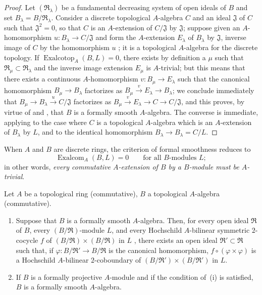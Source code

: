 \begin{proof}
Let $(\mathfrak{R}_\lambda)$ be a fundamental decreasing system of open ideals of $B$ and set $B_\lambda=B/\mathfrak{R}_\lambda$.
Consider a discrete topological $A$-algebra $C$ and an ideal $\mathfrak{J}$ of $C$ such that $\mathfrak{J}^2=0$, so that $C$ is an $A$-extension of $C/\mathfrak{J}$ by $\mathfrak{J}$;
suppose given an $A$-homomorphism $u:B_\lambda\to C/\mathfrak{J}$ and form the $A$-extension $E_\lambda$ of $B_\lambda$ by $\mathfrak{J}$, inverse image of $C$ by the homomorphism $u$ ;
it is a topological $A$-algebra for the discrete topology.
If $\operatorname{Exalcotop}_A(B,L)=0$, there exists by definition  a $\mu$ such that $\mathfrak{R}_\mu\subset\mathfrak{R}_\lambda$ and the inverse image extension $E_\mu$ is $A$-trivial;
but this means  that there exists a continuous $A$-homomorphism $v:B_\mu\to E_\lambda$ such that the canonical homomorphism $B_\mu\to B_\lambda$ factorizes as $B_\mu\xrightarrow{v}E_\lambda\to B_\lambda$;
we conclude immediately that $B_\mu\to B_\lambda\xrightarrow{u}C/\mathfrak{J}$ factorizes as $B_\mu\xrightarrow{v}E_\lambda\to C\to C/\mathfrak{J}$,
and this proves, by virtue of  and , that $B$ is a formally smooth $A$-algebra.
The converse is immediate, applying  to the case where $C$ is a topological $A$-algebra which is an $A$-extension of $B_\lambda$ by $L$, and to the identical homomorphism $B_\lambda\to B_\lambda=C/L$.
\end{proof}

When $A$ and $B$ are discrete rings, the criterion of formal smoothness  reduces to
\begin{equation}
\tag{19.4.4.1}
\label{0.19.4.4.1}
\operatorname{Exalcom}_A(B,L)=0 \qquad\text{for all $B$-modules $L$};
\end{equation}
in other words, \emph{every commutative $A$-extension of $B$ by a $B$-module must be $A$-trivial}.

\begin{corollary}[19.4.5]
\label{0.19.4.5}
Let $A$ be a topological ring (commutative), $B$ a topological $A$-algebra (commutative).
\begin{enumerate}
  \item[\rm(i)] Suppose that $B$ is a formally smooth $A$-algebra. Then, for every open ideal $\mathfrak{R}$ of $B$, every $(B/\mathfrak{R})$-module $L$, and every Hochschild $A$-bilinear symmetric $2$-cocycle $f$ of $(B/\mathfrak{R})\times(B/\mathfrak{R})$ in $L$ , there exists an open ideal $\mathfrak{R}'\subset\mathfrak{R}$ such that, if $\varphi:B/\mathfrak{R}'\to B/\mathfrak{R}$ is the canonical homomorphism, $f\circ(\varphi\times\varphi)$ is a Hochschild $A$-bilinear $2$-coboundary of $(B/\mathfrak{R}')\times(B/\mathfrak{R}')$ in $L$.
  \item[\rm(ii)] If $B$ is a formally projective $A$-module  and if the condition of~{\rm(i)} is satisfied, $B$ is a formally smooth $A$-algebra.
\end{enumerate}
\end{corollary}

